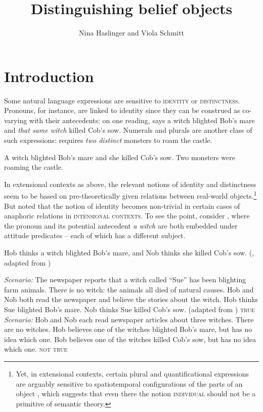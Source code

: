 \documentclass[output=paper]{langscibook}
\author{Nina Haslinger\affiliation{Georg-August-Universität Göttingen} and Viola Schmitt\affiliation{Humboldt-Universität zu Berlin}}
\title{Distinguishing belief objects}
\begin{document}
\maketitle



\section{Introduction} 

Some natural language expressions are sensitive to \textsc{identity} or \textsc{distinctness}. Pronouns, for instance, are linked to identity since they can be construed as co-varying with their antecedents: on one reading,  says a witch blighted Bob's mare and \textit{that same witch} killed Cob's sow. Numerals and plurals are another class of such expressions:  requires \textit{two distinct} monsters to roam the castle.

\ea
\ea\label{sch-has:ex:1} A witch blighted Bob's mare and she killed Cob's sow.
\ex\label{sch-has:ex:2} Two monsters were roaming the castle.
\z\z

\noindent In extensional contexts as above, the relevant notions of identity and distinctness seem to be based on pre-theoretically given relations between real-world objects.\footnote{Yet, in extensional contexts, certain plural and quantificational expressions are arguably sensitive to spatiotemporal configurations of the parts of an object \citep{Wagiel:2018}, which suggests that even there the notion \textsc{individual} should not be a primitive of semantic theory.} But \citet{Geach:1967} noted that the notion of identity becomes non-trivial  in certain cases of anaphoric relations in \textsc{intensional contexts}. To see the point, consider , where the pronoun and its potential antecedent \textit{a witch} are both embedded under attitude predicates -- each of which has a different subject.

\ea\label{sch-has:ex:3} Hob thinks a witch blighted Bob's mare, and Nob thinks she killed Cob's sow.  \hfill (\citealt[1, (1)]{Edelberg:1986}, adapted from \citealt[628, (3)]{Geach:1967}) \z

\eanoraggedright
\eanoraggedright\label{sch-has:ex:4} \textit{Scenario:} The newspaper reports that a witch called ``Sue'' has been blighting farm animals. There is no witch: the animals all died of natural causes.  Hob and Nob both read the newspaper and believe the stories about the witch. Hob thinks Sue blighted Bob's mare. Nob thinks Sue killed Cob's sow. (adapted from \citealt[2]{Edelberg:1986}) \phantom{.}\hfill {} \textsc{true}
\ex\label{sch-has:ex:5} \textit{Scenario:}  Hob and Nob each read newspaper articles about three wit\-ches. There are no witches. Hob believes one of the witches blighted Bob's mare, but has no idea which one. Bob believes one of the witches killed Cob's sow, but has no idea which one.  \hfill {} \textsc{not true}
\z\z
\end{document}
